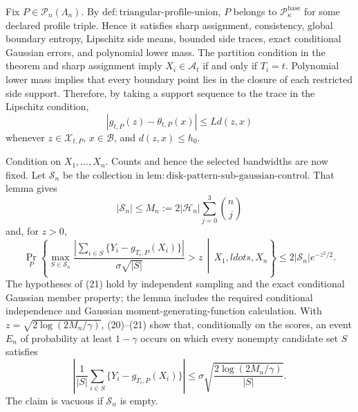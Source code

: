 Fix \(P\in\mathcal P_n(\Lambda_n)\). By \(\mathrm{def:triangular\text{-}profile\text{-}union}\), \(P\) belongs to \(\mathcal P_{\kappa}^{\mathrm{base}}\) for some declared profile triple. Hence it satisfies sharp assignment, consistency, global boundary entropy, Lipschitz side means, bounded side traces, exact conditional Gaussian errors, and polynomial lower mass. The partition condition in the theorem and sharp assignment imply \(X_i\in\mathcal A_t\) if and only if \(T_i=t\). Polynomial lower mass implies that every boundary point lies in the closure of each restricted side support. Therefore, by taking a support sequence to the trace in the Lipschitz condition,
\[
|g_{t,P}(z)-\theta_{t,P}(x)|\le Ld(z,x) \tag{19}
\]
whenever \(z\in\mathcal X_{t,P}\), \(x\in\mathcal B\), and \(d(z,x)\le h_0\).

Condition on \(X_1,\ldots,X_n\). Counts and hence the selected bandwidths are now fixed. Let \(\mathscr S_n\) be the collection in \(\mathrm{lem:disk\text{-}pattern\text{-}sub\text{-}gaussian\text{-}control}\). That lemma gives
\[
|\mathscr S_n|\le M_n:=2|\mathcal H_n|\sum_{j=0}^3\binom nj \tag{20}
\]
and, for \(z>0\),
\[
\Pr_P\left\{
\max_{S\in\mathscr S_n}
\frac{|\sum_{i\in S}\{Y_i-g_{T_i,P}(X_i)\}|}
{\sigma\sqrt{|S|}}>z
\,\middle|\,X_1,ldots,X_n\right\}
\le2|\mathscr S_n|e^{-z^2/2}. \tag{21}
\]
The hypotheses of (21) hold by independent sampling and the exact conditional Gaussian member property; the lemma includes the required conditional independence and Gaussian moment-generating-function calculation. With \(z=\sqrt{2\log(2M_n/\gamma)}\), (20)--(21) show that, conditionally on the scores, an event \(E_n\) of probability at least \(1-\gamma\) occurs on which every nonempty candidate set \(S\) satisfies
\[
\left|\frac1{|S|}\sum_{i\in S}\{Y_i-g_{T_i,P}(X_i)\}\right|
\le\sigma\sqrt{\frac{2\log(2M_n/\gamma)}{|S|}}. \tag{22}
\]
The claim is vacuous if \(\mathscr S_n\) is empty.

